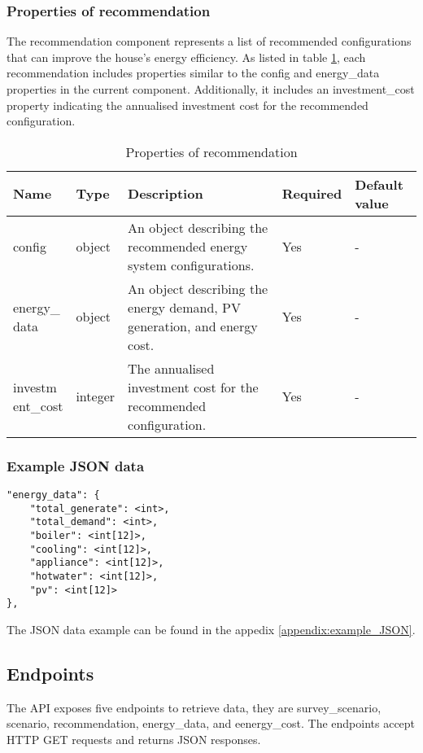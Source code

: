 \subsubsection{Properties of recommendation}

The recommendation component represents a list of recommended configurations that can improve the house's energy efficiency. 
As listed in table \ref{tab:properties_recommendation}, each recommendation includes properties similar to the config and energy\_data properties in the current component. 
Additionally, it includes an investment\_cost property indicating the annualised investment cost for the recommended configuration. 

\begin{table}[h!]
    \centering
    \small
    \begin{tabular}{ | p{} | p{} | p{} | p{} | p{} | } 
    \hline
    Name & Type & Description & Required & Default value \\
    \hline
    config & object & An object describing the recommended energy system configurations. & Yes & - \\
    \hline
    \makecell{energy\_\\data} & object & An object describing the energy demand, PV generation, and energy cost. & Yes & - \\
    \hline
    \makecell{investm\\ent\_cost} & integer & The annualised investment cost for the recommended configuration. & Yes & - \\
    \hline
    \end{tabular}
    \caption{Properties of recommendation}
    \label{tab:properties_recommendation}
\end{table}


\subsubsection{Example JSON data}

\begin{verbatim}
"energy_data": {
    "total_generate": <int>,
    "total_demand": <int>,
    "boiler": <int[12]>,
    "cooling": <int[12]>,
    "appliance": <int[12]>,
    "hotwater": <int[12]>,
    "pv": <int[12]>
},
\end{verbatim}

The JSON data example can be found in the appedix \ref{appendix:example_JSON}. 

\subsection{Endpoints}

The API exposes five endpoints to retrieve data,
they are survey\_scenario, scenario, recommendation, energy\_data, and eenergy\_cost.
The endpoints accept HTTP GET requests and returns JSON responses. 
